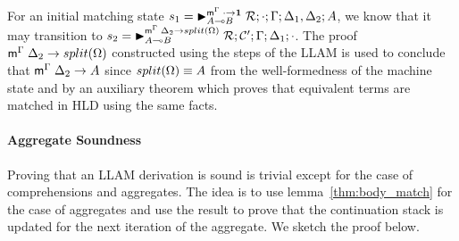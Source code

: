 For an initial matching state $s_1 = \matstate{A \lolli
B}{\rulestk}{\cdot}{\Gamma}{\Delta_1, \Delta_2}{A}{\cdot \rightarrow \one}$, we
know that it may transition to $s_2 = \matstate{A \lolli
B}{\rulestk}{\lstack{C'}}{\Gamma}{\Delta_1}{\cdot}{\Delta_2 \rightarrow
split(\Omega)}$. The proof $\mz{\Gamma}{\Delta_2}{split(\Omega)}$ constructed using the
steps of the LLAM is used to conclude that $\mz{\Gamma}{\Delta_2}{A}$ since
$\feq{split(\Omega)}{A}$ from the well-formedness of the machine state and by an
auxiliary theorem which proves that equivalent terms are matched in HLD using
the same facts.

\paragraph{Aggregate Soundness} Proving that an LLAM derivation is sound is
trivial except for the case of comprehensions and aggregates.  The idea is to
use lemma~\ref{thm:body_match} for the case of aggregates and use the result to
prove that the continuation stack is updated for the next iteration of the
aggregate. We sketch the proof below.


